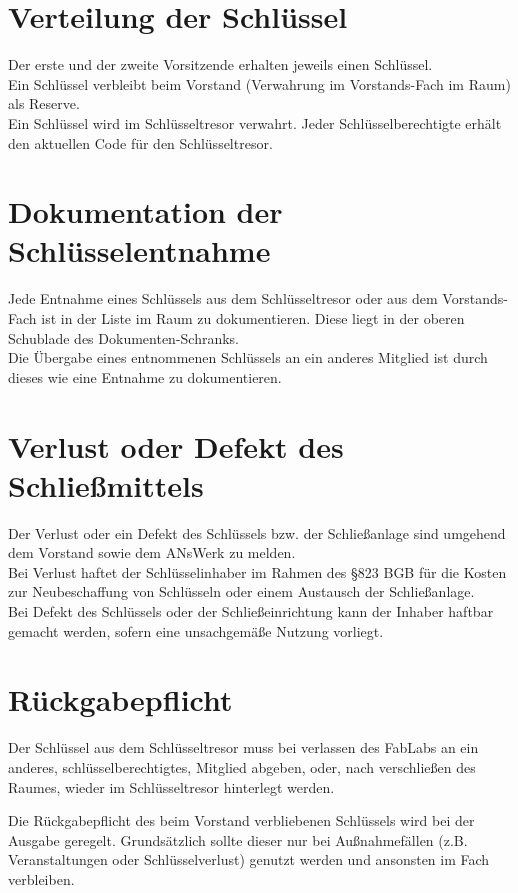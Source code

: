 \section{Verteilung der Schlüssel}
Der erste und der zweite Vorsitzende erhalten jeweils einen Schlüssel.\\
Ein Schlüssel verbleibt beim Vorstand (Verwahrung im Vorstands-Fach im Raum) als Reserve. \\
Ein Schlüssel wird im Schlüsseltresor verwahrt. Jeder Schlüsselberechtigte erhält den aktuellen Code für den Schlüsseltresor.

\section{Dokumentation der Schlüsselentnahme}
Jede Entnahme eines Schlüssels aus dem Schlüsseltresor oder aus dem Vorstands-Fach ist in der Liste im Raum zu dokumentieren. Diese liegt in der oberen Schublade des Dokumenten-Schranks. \\
Die Übergabe eines entnommenen Schlüssels an ein anderes Mitglied ist durch dieses wie eine Entnahme zu dokumentieren.

\section{Verlust oder Defekt des Schließmittels}
Der Verlust oder ein Defekt des Schlüssels bzw. der Schließanlage sind umgehend dem Vorstand sowie dem ANsWerk zu melden.\\
Bei Verlust haftet der Schlüsselinhaber im Rahmen des §823 BGB für die Kosten zur Neubeschaffung von Schlüsseln oder einem Austausch der Schließanlage.\\
Bei Defekt des Schlüssels oder der Schließeinrichtung kann der Inhaber haftbar gemacht werden, sofern eine unsachgemäße Nutzung vorliegt.

\section{Rückgabepflicht}
Der Schlüssel aus dem Schlüsseltresor muss bei verlassen des FabLabs an ein anderes, schlüsselberechtigtes, Mitglied abgeben, oder, nach verschließen des Raumes, wieder im Schlüsseltresor hinterlegt werden. 

Die Rückgabepflicht des beim Vorstand verbliebenen Schlüssels wird bei der Ausgabe geregelt. Grundsätzlich sollte dieser nur bei Außnahmefällen (z.B. Veranstaltungen oder Schlüsselverlust) genutzt werden und ansonsten im Fach verbleiben.

